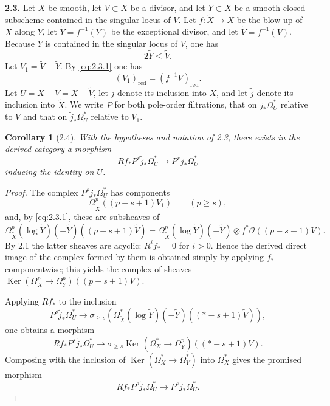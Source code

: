 \documentclass[11pt]{amsart}
\newtheorem{corollary}[theorem]{Corollary}
\theoremstyle{definition}
\DeclareMathOperator{\Ker}{Ker}
\begin{document}
\medskip
\noindent\textbf{2.3.} Let $X$ be smooth, let $V\subset X$ be a divisor, and let $Y\subset X$ be a smooth closed subscheme contained in the singular locus of $V$. Let $f:\widetilde X\to X$ be the blow-up of $X$ along $Y$, let $\widetilde Y=f^{-1}(Y)$ be the exceptional divisor, and let $\widetilde V=f^{-1}(V)$. Because $Y$ is contained in the singular locus of $V$, one has
\begin{equation}\label{eq:2.3.1}
2\widetilde Y \le \widetilde V.
\tag{2.3.1}
\end{equation}
Let $V_1=\widetilde V-\widetilde Y$. By \eqref{eq:2.3.1} one has
\[
(V_1)_{\mathrm{red}} = (f^{-1}V)_{\mathrm{red}}.
\]
Let $U=X-V = \widetilde X-\widetilde V$, let $j$ denote its inclusion into $X$, and let $\widetilde j$ denote its inclusion into $\widetilde X$. We write $P$ for both pole-order filtrations, that on $j_*\Omega_U^*$ relative to $V$ and that on $\widetilde j_*\Omega_U^*$ relative to $V_1$.

\begin{corollary}[2.4]
With the hypotheses and notation of \textup{2.3}, there exists in the derived category a morphism
\begin{equation}\label{eq:2.4.1}
Rf_* P^s\widetilde j_*\Omega_U^* \to P^s j_*\Omega_U^*
\tag{2.4.1}
\end{equation}
inducing the identity on $U$.
\end{corollary}

\begin{proof}
The complex $P^s\widetilde j_*\Omega_U^*$ has components
\[
\Omega_{\widetilde X}^p((p-s+1)V_1) \qquad (p\ge s),
\]
and, by \eqref{eq:2.3.1}, these are subsheaves of
\[
\Omega_{\widetilde X}^p(\log \widetilde Y)(-\widetilde Y)((p-s+1)\widetilde V)
= \Omega_{\widetilde X}^p(\log \widetilde Y)(-\widetilde Y)\otimes f^*\mathscr O((p-s+1)V).
\]
By 2.1 the latter sheaves are acyclic: $R^i f_*=0$ for $i>0$. Hence the derived direct image of the complex formed by them is obtained simply by applying $f_*$ componentwise; this yields the complex of sheaves $\Ker(\Omega_X^p\to \Omega_Y^p)((p-s+1)V)$.

Applying $Rf_*$ to the inclusion
\[
P^s\widetilde j_*\Omega_U^* \to \sigma_{\ge s}(\Omega_{\widetilde X}^*(\log \widetilde Y)(-\widetilde Y)((*-s+1)\widetilde V)),
\]
one obtains a morphism
\[
Rf_*P^s\widetilde j_*\Omega_U^* \to \sigma_{\ge s}\Ker(\Omega_X^*\to \Omega_Y^p)((*-s+1)V).
\]
Composing with the inclusion of $\Ker(\Omega_X^*\to \Omega_Y^*)$ into $\Omega_X^*$ gives the promised morphism
\[
Rf_*P^s\widetilde j_*\Omega_U^* \to P^s j_*\Omega_U^*.
\]
\end{proof}
\end{document}
